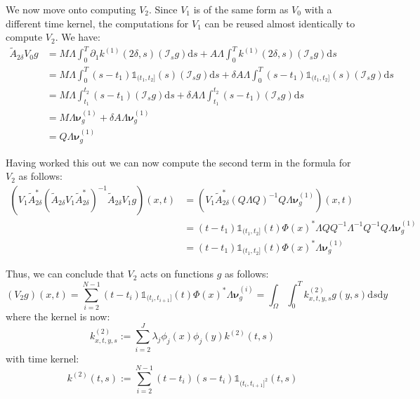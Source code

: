 \documentclass{article}
\theoremstyle{definition}
\theoremstyle{remark}
\theoremstyle{remark}
\begin{document}
\noindent We now move onto computing $V_2$. Since $V_1$ is of the same form as $V_0$ with a different time kernel, the computations for $V_1$ can be reused almost identically to compute $V_2$. We have:
\begin{align*}
    \tilde{A}_{2\delta}V_{0}g &= M\Lambda\int_{0}^{T}\partial_{1}k^{(1)}(2\delta,s)(\mathcal{I}_{s}g)\mathrm{d}s + A\Lambda\int_{0}^{T}k^{(1)}(2\delta,s)(\mathcal{I}_{s}g)\mathrm{d}s \\
    &= M\Lambda\int_{0}^{T}(s-t_1)\mathbb{1}_{(t_1,t_2]}(s)(\mathcal{I}_{s}g)\mathrm{d}s + \delta A\Lambda\int_{0}^{T}(s-t_1)\mathbb{1}_{(t_1,t_2]}(s)(\mathcal{I}_{s}g)\mathrm{d}s \\
    &= M\Lambda\int_{t_1}^{t_2}(s-t_1)(\mathcal{I}_{s}g)\mathrm{d}s + \delta A\Lambda\int_{t_1}^{t_2}(s-t_1)(\mathcal{I}_{s}g)\mathrm{d}s \\
    &= M\Lambda\boldsymbol{\nu}_{g}^{(1)}+\delta A\Lambda\boldsymbol{\nu}_{g}^{(1)} \\
    &= Q\Lambda\boldsymbol{\nu}_{g}^{(1)}
\end{align*}

\noindent Having worked this out we can now compute the second term in the formula for $V_2$ as follows:
\begin{align*}
    (V_{1}\tilde{A}_{2\delta}^{*}(\tilde{A}_{2\delta}V_{1}\tilde{A}_{2\delta}^{*})^{-1}\tilde{A}_{2\delta}V_{1}g)(x,t) &=
    (V_{1}\tilde{A}_{2\delta}^{*}(Q\Lambda Q)^{-1}Q\Lambda\boldsymbol{\nu}_{g}^{(1)})(x,t) \\
    &=(t-t_1)\mathbb{1}_{(t_1,t_2]}(t)\Phi(x)^{*}\Lambda Q Q^{-1}\Lambda^{-1}Q^{-1}Q\Lambda\boldsymbol{\nu}_{g}^{(1)} \\
    &=(t-t_1)\mathbb{1}_{(t_1,t_2]}(t)\Phi(x)^{*}\Lambda\boldsymbol{\nu}_{g}^{(1)}
\end{align*}

\noindent Thus, we can conclude that $V_2$ acts on functions $g$ as follows:
\begin{equation}
    (V_{2}g)(x,t) = \sum_{i=2}^{N-1}(t-t_i)\mathbb{1}_{(t_i,t_{i+1}]}(t)\Phi(x)^{*}\Lambda\boldsymbol{\nu}_{g}^{(i)} = \int_{\Omega}\int_{0}^{T}k^{(2)}_{x,t,y,s}g(y,s)\mathrm{d}s\mathrm{d}y
\end{equation}
where the kernel is now:
\begin{equation}
  k_{x,t,y,s}^{(2)}:=\sum_{i=2}^{J}\lambda_{j}\phi_{j}(x)\phi_{j}(y)k^{(2)}(t,s)
\end{equation}
with time kernel:
\begin{equation}
  k^{(2)}(t,s):=\sum_{i=2}^{N-1}(t-t_{i})(s-t_{i})\mathbb{1}_{(t_{i},t_{i+1}]^{2}}(t,s)
\end{equation}
\end{document}
